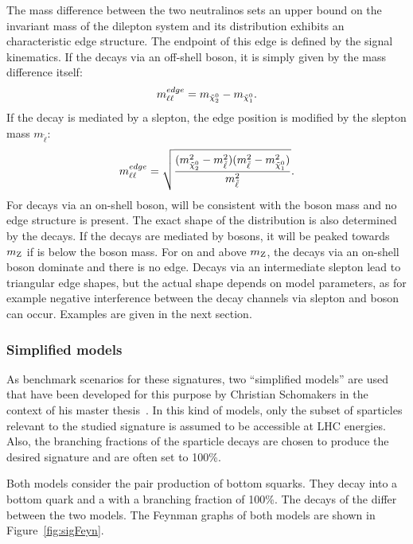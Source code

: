 The mass difference between the two neutralinos sets an upper bound on the invariant mass of the dilepton system \mll and its distribution exhibits an characteristic edge structure. The endpoint of this edge is defined by the signal kinematics.  If the \secondchi decays via an off-shell \Z boson, it is simply given by the mass difference itself:
\begin{equation}
m_{\ell\ell}^{edge} = m_{{\tilde{\chi}^0_2}} - m_{{\tilde{\chi}^0_1}}.
\end{equation}
If the decay is mediated by a slepton, the edge position is modified by the slepton mass $m_{\tilde{\ell}}$:
\begin{equation}
m_{\ell\ell}^{edge} = \sqrt{\frac{(m_{{\tilde{\chi}^0_2}}^2-m_{\tilde{\ell}}^2)(m_{\tilde{\ell}}^2-m_{{\tilde{\chi}^0_1}}^2)}{m_{\tilde{\ell}}^2}}. 
\end{equation}
For decays via an on-shell \Z boson, \mll will be consistent with the \Z boson mass and no edge structure is present. The exact shape of the distribution is also determined by the decays. If the decays are mediated by \Z bosons, it will be peaked towards $m_{\mathrm{Z}}$ if \mlledge is below the \Z boson mass. For \mlledge on and above $m_{\mathrm{Z}}$, the decays via an on-shell \Z boson dominate and there is no edge. Decays via an intermediate slepton lead to triangular edge shapes, but the actual shape depends on model parameters, as for example negative interference between the decay channels via slepton and \Z boson can occur. Examples are given in the next section.
\subsubsection{Simplified models}
\label{sec:models}
As benchmark scenarios for these signatures, two ``simplified models'' are used that have been developed for this purpose by Christian Schomakers in the context of his master thesis~\cite{Schomakers:2014zza}. In this kind of models, only the subset of sparticles relevant to the studied signature is assumed to be accessible at LHC energies. Also, the branching fractions of the sparticle decays are chosen to produce the desired signature and are often set to 100\%.  

Both models consider the pair production of bottom squarks. They decay into a bottom quark and a \secondchi with a branching fraction of 100\%. The decays of the \secondchi differ between the two models. The Feynman graphs of both models are shown in Figure~\ref{fig:sigFeyn}.

